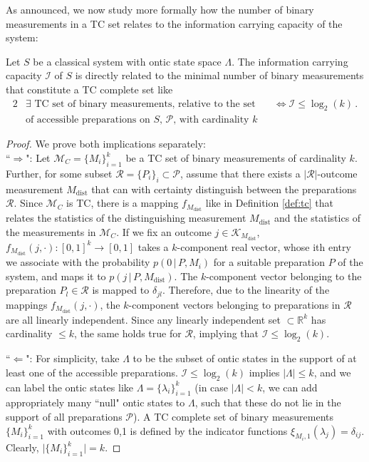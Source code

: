 As announced, we now study more formally how the number of binary measurements in a TC set relates to the information carrying capacity of the system:

\begin{lemma}
\label{lem:infcarcap}
Let $S$ be a classical system with ontic state space $\Lambda$. The information carrying capacity $\mathcal{I}$ of $S$ is directly related to the minimal number of binary measurements that constitute a TC complete set like
\begin{alignat*}{2}
& \exists \text{ TC set of binary measurements, relative to the set} && \iff \mathcal{I}\leq \log_2(k)\,.\\
& \text{of accessible preparations on $S$, $\mathcal{P}$, with cardinality $k$} && 
\end{alignat*}

\end{lemma}
\begin{proof}We prove both implications separately:\\[1em]
``$\Longrightarrow$": 
Let $\mathcal{M}_C=\{M_i\}_{i=1}^k$ be a TC set of binary measurements of cardinality $k$. Further, for some subset $\mathcal{R}=\{P_i\}_i\subset\mathcal{P}$, assume that there exists a $\vert\mathcal{R}\vert$-outcome measurement $M_{\text{dist}}$ that can with certainty distinguish between the preparations $\mathcal{R}$. Since $\mathcal{M}_C$ is TC, there is a mapping $f_{M_{\text{dist}}}$ like in Definition \ref{def:tc} that relates the statistics of the distinguishing measurement $M_{\text{dist}}$ and the statistics of the measurements in $\mathcal{M}_C$. If we fix an outcome $j\in\mathcal{K}_{M_{\text{dist}}}$, ${f_{M_{\text{dist}}}(j,\cdot):[0,1]^{k}\rightarrow[0,1]}$ takes a $k$-component real vector, whose ith entry we associate with the probability $p(0\,\vert\,P,M_i)$ for a suitable preparation $P$ of the system, and maps it to $p(j\,\vert\,P,M_{\text{dist}})$. The $k$-component vector belonging to the preparation $P_l\in\mathcal{R}$ is mapped to $\delta_{jl}$. Therefore, due to the linearity of the mappings $f_{M_{\text{dist}}}(j,\cdot)$, the $k$-component vectors belonging to preparations in $\mathcal{R}$ are all linearly independent. Since any linearly independent set $\subset \mathbb{R}^k$ has cardinality $\leq k$, the same holds true for $\mathcal{R}$, implying that $\mathcal{I}\leq\log_2(k)$.

``$\Longleftarrow$": For simplicity, take $\Lambda$ to be the subset of ontic states in the support of at least one of the accessible preparations. $\mathcal{I}\leq\log_2(k)$ implies $\vert\Lambda\vert\leq k$, and we can label the ontic states like $\Lambda=\{\lambda_i\}_{i=1}^k$ (in case $\vert\Lambda\vert<k$, we can add appropriately many ``null" ontic states to $\Lambda$, such that these do not lie in the support of all preparations $\mathcal{P}$). A TC complete set of binary measurements $\{M_i\}_{i=1}^k$ with outcomes 0,1 is defined by the indicator functions
$\xi_{M_i,1}(\lambda_j)=\delta_{ij}$. Clearly, $\vert \{M_i\}_{i=1}^k \vert=k$.
\end{proof}

